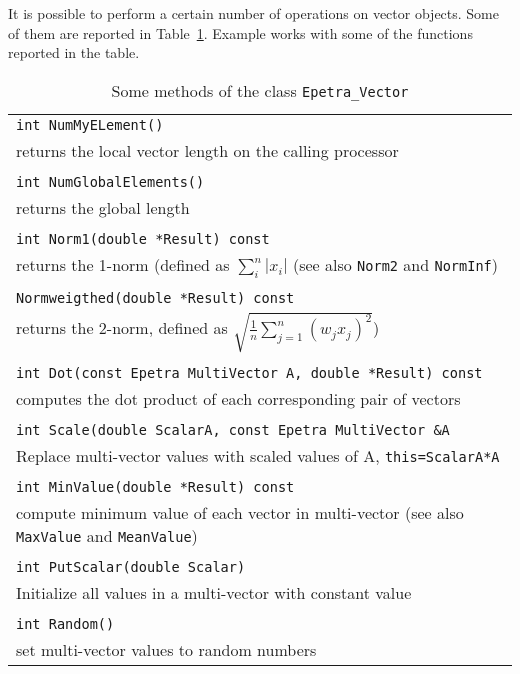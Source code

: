 \medskip

It is possible to perform a certain number of operations on vector
objects. Some of them are reported in Table~\ref{tab:distr_vec}.
Example  works with some of the functions reported in
the table.

\begin{table}
\begin{center}
\begin{tabular}{ | p{15cm} | }
\hline
\verb!int NumMyELement()! \\
returns the local vector length on the
calling processor \\
\\
\verb!int NumGlobalElements()! \\
returns the  global length\\
\\
\verb!int Norm1(double *Result) const! \\
returns the 1-norm (defined as $\sum_i^n |
  x_i|$ (see also \verb!Norm2! and \verb!NormInf!)\\
\\
\verb!Normweigthed(double *Result) const! \\
 returns the  2-norm, defined as
$\sqrt{ \frac{1}{n} \sum_{j=1}^{n} (w_j x_j)^2}$) \\
\\
\verb!int Dot(const Epetra MultiVector A, double *Result) const! \\
 computes
the dot product of each corresponding pair of vectors \\
\\
\verb!int Scale(double ScalarA, const Epetra MultiVector &A! \\
Replace multi-vector values with scaled values of A,
\verb!this=ScalarA*A! \\
\\
\verb!int MinValue(double *Result) const! \\
compute minimum value of
each vector in multi-vector (see also \verb!MaxValue! and \verb!MeanValue!)\\
\\
\verb!int PutScalar(double Scalar)! \\
Initialize all values in a
multi-vector with constant value \\
\\
\verb!int Random()! \\
 set multi-vector values to random numbers \\
\hline
\end{tabular}
\caption{Some methods of the class {\tt Epetra\_Vector}}
\label{tab:distr_vec}
\end{center}
\end{table}

